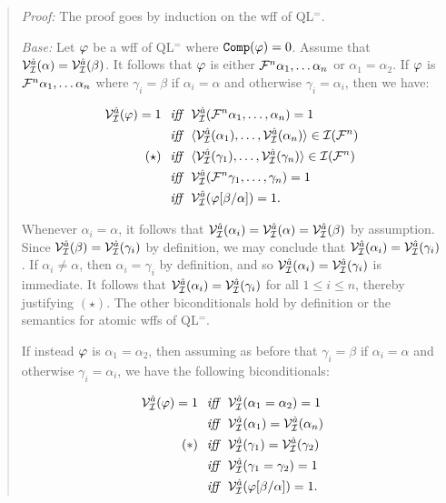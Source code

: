\begin{quote} 
  \textit{Proof:}
  The proof goes by induction on the wff of QL$^=$. 

  \textit{Base:} Let $\varphi$ be a wff of QL$^=$ where $\texttt{Comp}(\varphi)=0$.
  Assume that $\mathcal{V}_{\mathcal{I}}^{\hat{a}}(\alpha)=\mathcal{V}_{\mathcal{I}}^{\hat{a}}(\beta)$.
  It follows that $\varphi$ is either $\mathcal{F}^n\alpha_1,\ldots\alpha_n$ or $\alpha_1=\alpha_2$.
  If $\varphi$ is $\mathcal{F}^n\alpha_1,\ldots\alpha_n$ where $\gamma_i=\beta$ if $\alpha_i=\alpha$ and otherwise $\gamma_i=\alpha_i$, then we have:

  \vspace{-.2in}
  \begin{align*}
    \mathcal{V}_{\mathcal{I}}^{\hat{a}}(\varphi)=1 &\textit{ ~iff~ } \mathcal{V}_{\mathcal{I}}^{\hat{a}}(\mathcal{F}^n\alpha_1,\ldots,\alpha_n)=1\\
      &\textit{ ~iff~ } \langle\mathcal{V}_{\mathcal{I}}^{\hat{a}}(\alpha_1),\ldots,\mathcal{V}_{\mathcal{I}}^{\hat{a}}(\alpha_n)\rangle\in\mathcal{I}(\mathcal{F}^n)\\
      (\star) &\textit{ ~iff~ } \langle\mathcal{V}_{\mathcal{I}}^{\hat{a}}(\gamma_1),\ldots,\mathcal{V}_{\mathcal{I}}^{\hat{a}}(\gamma_n)\rangle\in\mathcal{I}(\mathcal{F}^n)\\
      &\textit{ ~iff~ } \mathcal{V}_{\mathcal{I}}^{\hat{a}}(\mathcal{F}^n\gamma_1,\ldots,\gamma_n)=1\\
      &\textit{ ~iff~ } \mathcal{V}_{\mathcal{I}}^{\hat{a}}(\varphi[\beta/\alpha])=1.
  \end{align*}

  Whenever $\alpha_i=\alpha$, it follows that $\mathcal{V}_{\mathcal{I}}^{\hat{a}}(\alpha_i)=\mathcal{V}_{\mathcal{I}}^{\hat{a}}(\alpha)=\mathcal{V}_{\mathcal{I}}^{\hat{a}}(\beta)$ by assumption.
  Since $\mathcal{V}_{\mathcal{I}}^{\hat{a}}(\beta)=\mathcal{V}_{\mathcal{I}}^{\hat{a}}(\gamma_i)$ by definition, we may conclude that $\mathcal{V}_{\mathcal{I}}^{\hat{a}}(\alpha_i)=\mathcal{V}_{\mathcal{I}}^{\hat{a}}(\gamma_i)$.
  If $\alpha_i\neq\alpha$, then $\alpha_i=\gamma_i$ by definition, and so $\mathcal{V}_{\mathcal{I}}^{\hat{a}}(\alpha_i)=\mathcal{V}_{\mathcal{I}}^{\hat{a}}(\gamma_i)$ is immediate.
  It follows that $\mathcal{V}_{\mathcal{I}}^{\hat{a}}(\alpha_i)=\mathcal{V}_{\mathcal{I}}^{\hat{a}}(\gamma_i)$ for all $1\leq i\leq n$, thereby justifying $(\star)$.
  The other biconditionals hold by definition or the semantics for atomic wffs of QL$^=$.

  If instead $\varphi$ is $\alpha_1=\alpha_2$, then assuming as before that $\gamma_i=\beta$ if $\alpha_i=\alpha$ and otherwise $\gamma_i=\alpha_i$, we have the following biconditionals:

  \vspace{-.2in}
  \begin{align*}
    \mathcal{V}_{\mathcal{I}}^{\hat{a}}(\varphi)=1 &\textit{ ~iff~ } \mathcal{V}_{\mathcal{I}}^{\hat{a}}(\alpha_1=\alpha_2)=1\\
      &\textit{ ~iff~ } \mathcal{V}_{\mathcal{I}}^{\hat{a}}(\alpha_1)=\mathcal{V}_{\mathcal{I}}^{\hat{a}}(\alpha_n)\\
      (\ast) &\textit{ ~iff~ } \mathcal{V}_{\mathcal{I}}^{\hat{a}}(\gamma_1)=\mathcal{V}_{\mathcal{I}}^{\hat{a}}(\gamma_2)\\
      &\textit{ ~iff~ } \mathcal{V}_{\mathcal{I}}^{\hat{a}}(\gamma_1=\gamma_2)=1\\
      &\textit{ ~iff~ } \mathcal{V}_{\mathcal{I}}^{\hat{a}}(\varphi[\beta/\alpha])=1.
  \end{align*}


\end{quote}
